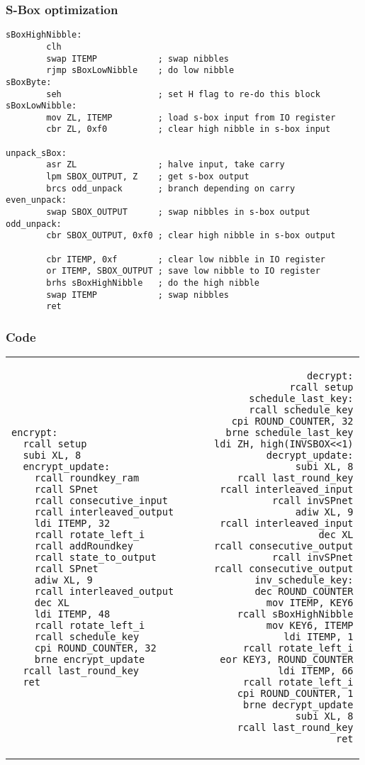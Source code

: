 \documentclass{beamer}
\begin{document}
\begin{frame}[fragile]
\frametitle{S-Box optimization}
\begin{lstlisting}
sBoxHighNibble:
        clh
        swap ITEMP            ; swap nibbles
        rjmp sBoxLowNibble    ; do low nibble
sBoxByte:
        seh                   ; set H flag to re-do this block
sBoxLowNibble:
        mov ZL, ITEMP         ; load s-box input from IO register
        cbr ZL, 0xf0          ; clear high nibble in s-box input

unpack_sBox:
        asr ZL                ; halve input, take carry
        lpm SBOX_OUTPUT, Z    ; get s-box output
        brcs odd_unpack       ; branch depending on carry
even_unpack:
        swap SBOX_OUTPUT      ; swap nibbles in s-box output
odd_unpack:
        cbr SBOX_OUTPUT, 0xf0 ; clear high nibble in s-box output

        cbr ITEMP, 0xf        ; clear low nibble in IO register
        or ITEMP, SBOX_OUTPUT ; save low nibble to IO register
        brhs sBoxHighNibble   ; do the high nibble
        swap ITEMP            ; swap nibbles
        ret
\end{lstlisting}
\end{frame}

\lstset{basicstyle=\tiny\sffamily}
\begin{frame}[fragile]
\frametitle{Code}
	\begin{tabular}{ l r }
\begin{lstlisting}
encrypt:
  rcall setup
  subi XL, 8
  encrypt_update:
    rcall roundkey_ram
    rcall SPnet
    rcall consecutive_input
    rcall interleaved_output
    ldi ITEMP, 32
    rcall rotate_left_i
    rcall addRoundkey
    rcall state_to_output
    rcall SPnet
    adiw XL, 9
    rcall interleaved_output
    dec XL
    ldi ITEMP, 48
    rcall rotate_left_i
    rcall schedule_key
    cpi ROUND_COUNTER, 32
    brne encrypt_update
  rcall last_round_key
  ret
\end{lstlisting}
&
\begin{lstlisting}
decrypt:
  rcall setup
  schedule_last_key:
    rcall schedule_key
    cpi ROUND_COUNTER, 32
    brne schedule_last_key
  ldi ZH, high(INVSBOX<<1)
  decrypt_update:
    subi XL, 8
    rcall last_round_key
    rcall interleaved_input
    rcall invSPnet
    adiw XL, 9
    rcall interleaved_input
    dec XL
    rcall consecutive_output
    rcall invSPnet
    rcall consecutive_output
    inv_schedule_key:
      dec ROUND_COUNTER
      mov ITEMP, KEY6
      rcall sBoxHighNibble
      mov KEY6, ITEMP
      ldi ITEMP, 1
      rcall rotate_left_i
      eor KEY3, ROUND_COUNTER
      ldi ITEMP, 66
      rcall rotate_left_i
    cpi ROUND_COUNTER, 1
    brne decrypt_update
  subi XL, 8
  rcall last_round_key
  ret
\end{lstlisting}
	\end{tabular}
\end{frame}
\end{document}
